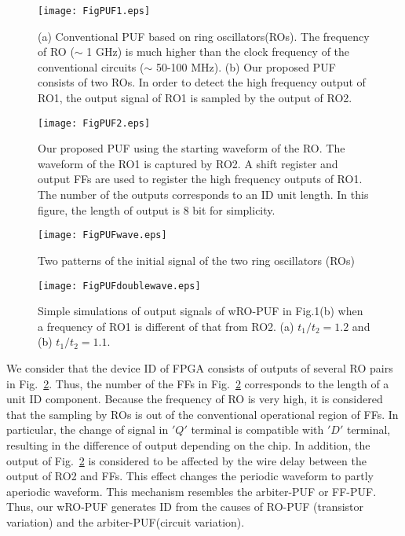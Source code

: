 ﻿\documentclass[aps,preprint,prb,superscriptaddress,amsmath,showpacs,tightenlines]{revtex4}
\begin{document}
\begin{figure}[t]
\begin{center}\texttt{[image: FigPUF1.eps]}
\caption{ 
(a) Conventional PUF based on ring oscillators(ROs). The frequency of RO ($\sim$ 1 GHz) is much higher than the clock frequency of the conventional circuits ($\sim$ 50-100 MHz).
(b) Our proposed PUF consists of two ROs. In order to detect the high frequency output of RO1, 
the output signal of RO1 is sampled by the output of RO2.} 
\label{Start}
\end{center}
\end{figure}


\begin{figure}[t]
\begin{center}\texttt{[image: FigPUF2.eps]}
\caption{ 
Our proposed PUF using the starting waveform 
of the RO. The waveform of the RO1 is captured by RO2. 
A shift register and output FFs are used to register the high frequency outputs of RO1.
The number of the outputs corresponds to an
ID unit length. In this figure, the length of output is 8 bit for 
simplicity.} 
\label{allcircuit}
\end{center}
\end{figure}
\begin{figure}
\centering
\texttt{[image: FigPUFwave.eps]}
\caption{
Two patterns of the initial signal of the two ring oscillators (ROs)} 
\label{waveform}
\end{figure}
\begin{figure}
\centering
\texttt{[image: FigPUFdoublewave.eps]}
\caption{
Simple simulations of output signals of wRO-PUF 
in Fig.1(b) when 
a frequency of RO1 is different of that from RO2.
(a) $t_1/t_2=1.2$ and (b) $t_1/t_2=1.1$.} 
\label{doublewave}
\end{figure}

We consider that the device ID of FPGA 
consists of outputs of several RO pairs in Fig.~\ref{allcircuit}.
Thus, the number of the FFs in Fig.~\ref{allcircuit} corresponds 
to the length of a unit ID component.
Because the frequency of RO is very high, it is considered that 
the sampling by ROs is out of the conventional operational region of FFs.
In particular, the change of signal in $'Q'$ terminal  
is compatible with $'D'$ terminal, 
resulting in the difference of output depending on the chip.
In addition, the output of Fig.~\ref{allcircuit} is 
considered to be affected by the wire delay between the output of RO2 and FFs.
This effect changes the periodic waveform to partly 
aperiodic waveform.
This mechanism resembles the arbiter-PUF or FF-PUF.
Thus, our wRO-PUF generates ID from the 
causes of RO-PUF (transistor variation) and  the arbiter-PUF(circuit variation).
\end{document}
